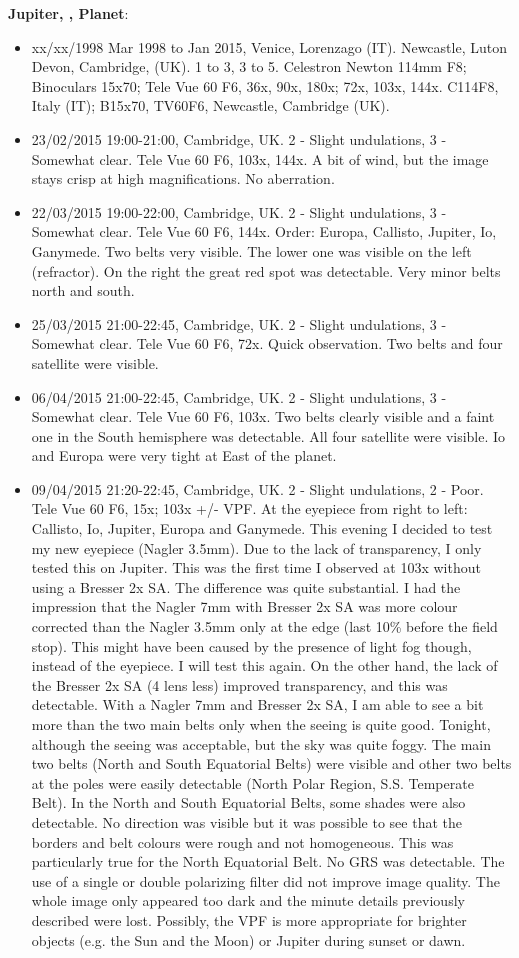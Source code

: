 {\bf Jupiter, , Planet}:
\begin{itemize}
\item xx/xx/1998 Mar 1998 to Jan 2015, Venice, Lorenzago (IT). Newcastle, Luton Devon, Cambridge, (UK). 1 to 3, 3 to 5. Celestron Newton 114mm F8; Binoculars 15x70; Tele Vue 60 F6, 36x, 90x, 180x; 72x, 103x, 144x. C114F8, Italy (IT); B15x70, TV60F6, Newcastle, Cambridge (UK).
\item 23/02/2015 19:00-21:00, Cambridge, UK. 2 - Slight undulations, 3 - Somewhat clear. Tele Vue 60 F6, 103x, 144x. A bit of wind, but the image stays crisp at high magnifications. No aberration.
\item 22/03/2015 19:00-22:00, Cambridge, UK. 2 - Slight undulations, 3 - Somewhat clear. Tele Vue 60 F6, 144x. Order: Europa, Callisto, Jupiter, Io, Ganymede. Two belts very visible. The lower one was visible on the left (refractor). On the right the great red spot was detectable. Very minor belts north and south. 
\item 25/03/2015 21:00-22:45, Cambridge, UK. 2 - Slight undulations, 3 - Somewhat clear. Tele Vue 60 F6, 72x. Quick observation. Two belts and four satellite were visible. 
\item 06/04/2015 21:00-22:45, Cambridge, UK. 2 - Slight undulations, 3 - Somewhat clear. Tele Vue 60 F6, 103x. Two belts clearly visible and a faint one in the South hemisphere was detectable. All four satellite were visible. Io and Europa were very tight at East of the planet.
\item 09/04/2015 21:20-22:45, Cambridge, UK. 2 - Slight undulations, 2 - Poor. Tele Vue 60 F6, 15x; 103x +/- VPF. At the eyepiece from right to left: Callisto, Io, Jupiter, Europa and Ganymede. This evening I decided to test my new eyepiece (Nagler 3.5mm). Due to the lack of transparency, I only tested this on Jupiter. This was the first time I observed at 103x without using a Bresser 2x SA. The difference was quite substantial. I had the impression that the Nagler 7mm with Bresser 2x SA was more colour corrected than the Nagler 3.5mm only at the edge (last 10\% before the field stop). This might have been caused by the presence of light fog though, instead of the eyepiece. I will test this again. On the other hand, the lack of the Bresser 2x SA (4 lens less) improved transparency, and this was detectable. With a Nagler 7mm and Bresser 2x SA, I am able to see a bit more than the two main belts only when the seeing is quite good. Tonight, although the seeing was acceptable, but the sky was quite foggy. The main two belts (North and South Equatorial Belts) were visible and other two belts at the poles were easily detectable (North Polar Region, S.S. Temperate Belt). In the North and South Equatorial Belts, some shades were also detectable. No direction was visible but it was possible to see that the borders and belt colours were rough and not homogeneous. This was particularly true for the North Equatorial Belt. No GRS was detectable. The use of a single or double polarizing filter did not improve image quality. The whole image only appeared too dark and the minute details previously described were lost. Possibly, the VPF is more appropriate for brighter objects (e.g. the Sun and the Moon) or Jupiter during sunset or dawn. 

\end{itemize}
